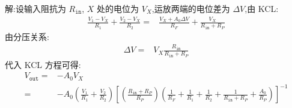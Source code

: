     解:设输入阻抗为 $R_{\texttt{in}}$, $X$ 处的电位为 $V_{X}$,运放两端的电位差为 $\Delta V$,由 KCL:
    \begin{align}
        \frac{V_1-V_{X}}{R_1}+\frac{V_2-V_{X}}{R_2}=&\frac{V_{X}+A_0\Delta V}{R_{F}}+\frac{V_{X}}{R_{\texttt{in}}+R_{P}}\nonumber
    \end{align}
    由分压关系:
    \begin{align}
        \Delta V=&V_{X} \frac{R_{\texttt{in}}}{R_{\texttt{in}}+R_{P}}\nonumber
    \end{align}
    代入 KCL 方程可得:
    \begin{align}
        V_{\texttt{out}}=&-A_0V_{X}\nonumber\\
        =&-A_0\left( \frac{V_1}{R_1}+\frac{V_2}{R_2} \right) \left[\left( \frac{R_{\texttt{in}}+R_{P}}{R_{P}} \right) \left( \frac{1}{R_{F}}+\frac{1}{R_1}+\frac{1}{R_2}+\frac{1}{R_{\texttt{in}}+R_{P}}+\frac{A_0}{R_{P}} \right) \right]^{-1}\nonumber
    \end{align}

